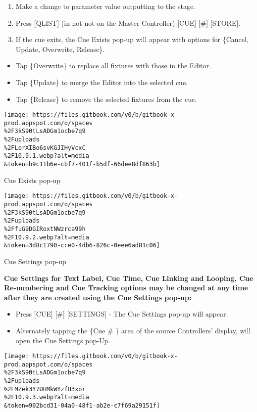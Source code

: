 \documentclass[
]{article}
\begin{document}
\begin{enumerate}
\def\labelenumi{\arabic{enumi}.}
\item
  Make a change to parameter value outputting to the stage.
\item
  Press {[}QLIST{]} (in not not on the Master Controller) {[}CUE{]} {[}\#{]} {[}STORE{]}.
\item
  If the cue exits, the Cue Exists pop-up will appear with options for \{Cancel, Update, Overwrite, Release\}.
\end{enumerate}

\begin{itemize}
\item
  Tap \{Overwrite\} to replace all fixtures with those in the Editor.
\item
  Tap \{Update\} to merge the Editor into the selected cue.
\item
  Tap \{Release\} to remove the selected fixtures from the cue.
\end{itemize}

\texttt{[image: https://files.gitbook.com/v0/b/gitbook-x-prod.appspot.com/o/spaces\\\%2F3kS90tLsADGm1ocbe7q9\\\%2Fuploads\\\%2FLorXIBo6svKGJIHyVcxC\\\%2F10.9.1.webp?alt=media\\\&token=b9c11b6e-cbf7-401f-b5df-66dee8df863b]}

Cue Exists pop-up

\texttt{[image: https://files.gitbook.com/v0/b/gitbook-x-prod.appspot.com/o/spaces\\\%2F3kS90tLsADGm1ocbe7q9\\\%2Fuploads\\\%2FfuG9DGIRoxtNWzrca99h\\\%2F10.9.2.webp?alt=media\\\&token=3d8c1790-cce0-4db6-826c-0eee6ad81c06]}

Cue Settings pop-up

\textbf{Cue Settings for Text Label, Cue Time, Cue Linking and Looping, Cue Re-numbering and Cue Tracking options may be changed at any time after they are created using the Cue Settings pop-up:}

\begin{itemize}
\item
  Press {[}CUE{]} {[}\#{]} {[}SETTINGS{]} - The Cue Settings pop-up will appear.
\item
  Alternately tapping the \{Cue \# \} area of the source Controllers' display, will open the Cue Settings pop-Up.
\end{itemize}

\texttt{[image: https://files.gitbook.com/v0/b/gitbook-x-prod.appspot.com/o/spaces\\\%2F3kS90tLsADGm1ocbe7q9\\\%2Fuploads\\\%2FMZek3Y7UHMkWYzfH3xor\\\%2F10.9.3.webp?alt=media\\\&token=902bcd31-04a0-48f1-ab2e-c7f69a29151f]}
\end{document}
